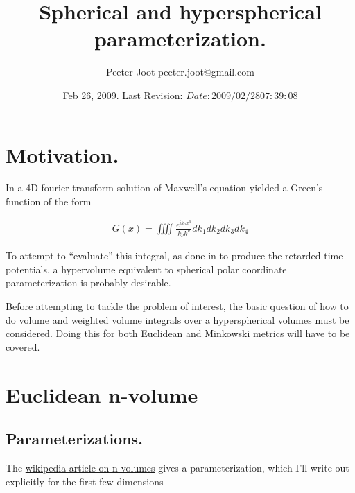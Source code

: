 \documentclass{article}
\title{ Spherical and hyperspherical parameterization. }
\author{Peeter Joot \quad peeter.joot@gmail.com }
\date{ Feb 26, 2009.  Last Revision: $Date: 2009/02/28 07:39:08 $ }
\begin{document}
\maketitle{}
\tableofcontents

\section{ Motivation. }

In \cite{PJ4dFourier} a 4D fourier transform solution 
of Maxwell's equation yielded a Green's function of the form

\begin{align*}
G(x) = \iiiint \frac{e^{i k_\mu x^\mu}}{k_\nu k^\nu} dk_1 dk_2 dk_3 dk_4
\end{align*}

To attempt to ``evaluate'' this integral, as done in
\cite{PJpoisson}
to produce the retarded time potentials,
a hypervolume equivalent to spherical polar coordinate
parameterization is probably desirable.

Before attempting to tackle the problem of interest, the basic question
of how to do volume and weighted volume integrals over a hyperspherical volumes
must be considered.  Doing this for both Euclidean and Minkowski metrics will have to be covered.

\section{ Euclidean n-volume }

\subsection{ Parameterizations. }

The \href{http://en.wikipedia.org/wiki/Hypersphere}{wikipedia article on n-volumes} gives a parameterization, which I'll write out explicitly for the first few dimensions
\end{document}
